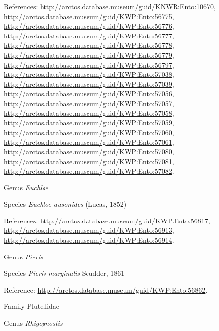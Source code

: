 \documentclass[9pt, article]{memoir}
\begin{document}
\begin{multicols}{2}
\vspace{6pt}References: 
\url{http://arctos.database.museum/guid/KNWR:Ento:10670}, 
\url{http://arctos.database.museum/guid/KWP:Ento:56775}, 
\url{http://arctos.database.museum/guid/KWP:Ento:56776}, 
\url{http://arctos.database.museum/guid/KWP:Ento:56777}, 
\url{http://arctos.database.museum/guid/KWP:Ento:56778}, 
\url{http://arctos.database.museum/guid/KWP:Ento:56779}, 
\url{http://arctos.database.museum/guid/KWP:Ento:56797}, 
\url{http://arctos.database.museum/guid/KWP:Ento:57038}, 
\url{http://arctos.database.museum/guid/KWP:Ento:57039}, 
\url{http://arctos.database.museum/guid/KWP:Ento:57056}, 
\url{http://arctos.database.museum/guid/KWP:Ento:57057}, 
\url{http://arctos.database.museum/guid/KWP:Ento:57058}, 
\url{http://arctos.database.museum/guid/KWP:Ento:57059}, 
\url{http://arctos.database.museum/guid/KWP:Ento:57060}, 
\url{http://arctos.database.museum/guid/KWP:Ento:57061}, 
\url{http://arctos.database.museum/guid/KWP:Ento:57080}, 
\url{http://arctos.database.museum/guid/KWP:Ento:57081}, 
\url{http://arctos.database.museum/guid/KWP:Ento:57082}.

\vspace{6pt}\noindent\hspace{30pt}Genus \textit{Euchloe}


\vspace{6pt}\noindent\hspace{36pt}Species \textit{Euchloe ausonides} (Lucas, 1852)


\vspace{6pt}References: 
\url{http://arctos.database.museum/guid/KWP:Ento:56817}, 
\url{http://arctos.database.museum/guid/KWP:Ento:56913}, 
\url{http://arctos.database.museum/guid/KWP:Ento:56914}.

\vspace{6pt}\noindent\hspace{30pt}Genus \textit{Pieris}


\vspace{6pt}\noindent\hspace{36pt}Species \textit{Pieris marginalis} Scudder, 1861


\vspace{6pt}Reference: 
\url{http://arctos.database.museum/guid/KWP:Ento:56862}.

\vspace{6pt}\noindent\hspace{24pt}Family Plutellidae


\vspace{6pt}\noindent\hspace{30pt}Genus \textit{Rhigognostis}



\end{multicols}
\end{document}
